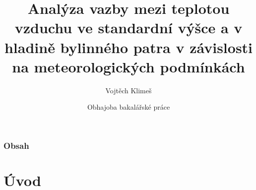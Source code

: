 \documentclass[
	11pt, %
]{beamer}
\title[]{Analýza vazby mezi teplotou vzduchu ve standardní výšce a v hladině bylinného patra v závislosti na meteorologických podmínkách} %
\author[]{Vojtěch Klimeš} %
\institute[MFF UK]{Univerzita Karlova} %
\date[5.9.2023]{Obhajoba bakalářské práce} %
\begin{document}

\begin{frame}
	\titlepage %
\end{frame}



\begin{frame}
	\frametitle{Obsah} %
	
	\tableofcontents %
\end{frame}


\section{Úvod} %
\end{document}
